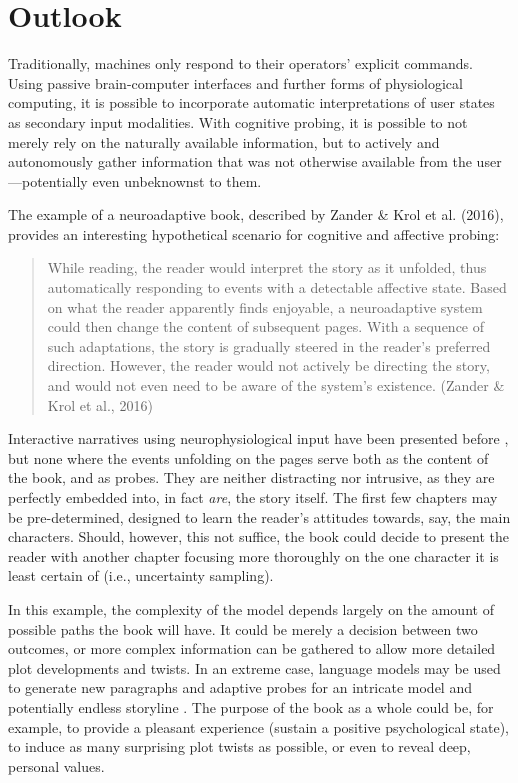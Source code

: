 \section{Outlook}
Traditionally, machines only respond to their operators' explicit commands. Using passive brain-computer interfaces and further forms of physiological computing, it is possible to incorporate automatic interpretations of user states as secondary input modalities. With cognitive probing, it is possible to not merely rely on the naturally available information, but to actively and autonomously gather information that was not otherwise available from the user---potentially even unbeknownst to them. 

The example of a neuroadaptive book, described by Zander \& Krol et al. (2016), provides an interesting hypothetical scenario for cognitive and affective probing:

\begin{quote}
While reading, the reader would interpret the story as it unfolded, thus automatically responding to events with a detectable affective state. Based on what the reader apparently finds enjoyable, a neuroadaptive system could then change the content of subsequent pages. With a sequence of such adaptations, the story is gradually steered in the reader's preferred direction. However, the reader would not actively be directing the story, and would not even need to be aware of the system's existence. (Zander \& Krol et al., 2016)
\end{quote}

Interactive narratives using neurophysiological input have been presented before \cite{gilroy2013bcinarrative}, but none where the events unfolding on the pages serve both as the content of the book, and as probes. They are neither distracting nor intrusive, as they are perfectly embedded into, in fact \emph{are}, the story itself. The first few chapters may be pre-determined, designed to learn the reader's attitudes towards, say, the main characters. Should, however, this not suffice, the book could decide to present the reader with another chapter focusing more thoroughly on the one character it is least certain of (i.e., uncertainty sampling).

In this example, the complexity of the model depends largely on the amount of possible paths the book will have. It could be merely a decision between two outcomes, or more complex information can be gathered to allow more detailed plot developments and twists. In an extreme case, language models may be used to generate new paragraphs and adaptive probes for an intricate model and potentially endless storyline \cite{radford2019language}. The purpose of the book as a whole could be, for example, to provide a pleasant experience (sustain a positive psychological state), to induce as many surprising plot twists as possible, or even to reveal deep, personal values.

